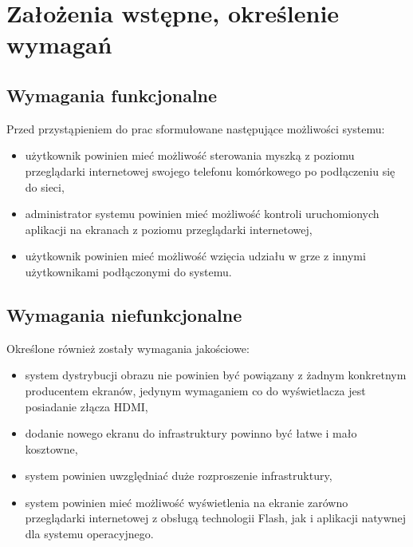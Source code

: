 \newpage
\section{Założenia wstępne, określenie wymagań}
\label{sec:requirement}

\subsection{Wymagania funkcjonalne}

Przed przystąpieniem do prac sformułowane następujące możliwości systemu:

\begin{itemize}
	\item użytkownik powinien mieć możliwość sterowania myszką z poziomu przeglądarki internetowej swojego telefonu komórkowego po podłączeniu się do sieci,
	\item administrator systemu powinien mieć możliwość kontroli uruchomionych aplikacji na ekranach z poziomu przeglądarki internetowej,
	\item użytkownik powinien mieć możliwość wzięcia udziału w grze z innymi użytkownikami podłączonymi do systemu.
\end{itemize}


\subsection{Wymagania niefunkcjonalne}

Określone również zostały wymagania jakościowe:

\begin{itemize}
	\item system dystrybucji obrazu nie powinien być powiązany z żadnym konkretnym producentem ekranów, jedynym wymaganiem co do wyświetlacza jest posiadanie złącza HDMI,
	\item dodanie nowego ekranu do infrastruktury powinno być łatwe i mało kosztowne,
	\item system powinien uwzględniać duże rozproszenie infrastruktury,
	\item system powinien mieć możliwość wyświetlenia na ekranie zarówno przeglądarki internetowej z obsługą technologii Flash, jak i aplikacji natywnej dla systemu operacyjnego.
\end{itemize}

